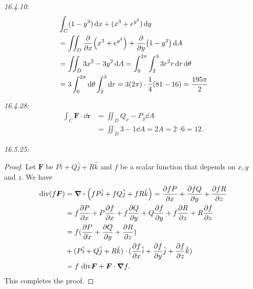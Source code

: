 \documentclass[8pt,twocolumn]{article}
\begin{document}
\begin{Answer}[number=42]
  \emph{16.4.10:}
  \begin{align*}
    &\int_C (1-y^3) \dd{x} + (x^3+e^{y^2}) \dd{y}\\ &= \iint_{D}
    \pdv{x}(x^3+e^{y^2}) + \pdv{y}(1-y^3) \dd{A} \\
    &= \iint_{D} 3x^2 - 3y^2 \dd{A} = \int_0^{2\pi} \int_2^3 3r^2
    r\dd{r}\dd{\theta}\\
    &= 3\int_0^{2\pi}\dd{\theta} \int_2^3 \dd{r} =
    3(2\pi)\cdot\frac{1}{4}(81-16) = \frac{195\pi}{2}
  \end{align*}

  \emph{16.4.28:}
  \begin{align*}
    \int_C \bm{F} \cdot \dd{\bm{r}} &= \iint_D Q_x - P_y \dd{A} \\
    &= \iint_D 3 - 1 \dd{A} = 2A = 2\cdot 6 =12.
  \end{align*}

  \emph{16.5.25:}
  \begin{proof}
    Let $\bm{F}$ be $P\hat{i} + Q\hat{j} + R\hat{k}$ and $f$ be a scalar function
    that depends on $x,y$ and $z$. We have
    \begin{align*}
      \text{div} (f\bm{F}) &= \div (fP\hat{i} + fQ\hat{j} + fR\hat{k}) = \pdv{fP}{x} +
      \pdv{fQ}{y} + \pdv{fR}{z}\\
      &= f\pdv{P}{x} + P\pdv{f}{x} + f\pdv{Q}{y} + Q\pdv{f}{y} + f\pdv{R}{z} +
      R\pdv{f}{z} \\
      &= f(\pdv{P}{x} + \pdv{Q}{y} + \pdv{R}{z}) \\
      &+ (P\hat{i} + Q\hat{j} +
      R\hat{k}) \cdot (\pdv{f}{x}\hat{i} + \pdv{f}{y}\hat{j} + \pdv{f}{z}\hat{k})
      \\
      &= f\text{ div} \bm{F} + \bm{F}\cdot\grad f.
    \end{align*}
    This completes the proof.
  \end{proof}
\end{Answer}
\end{document}
